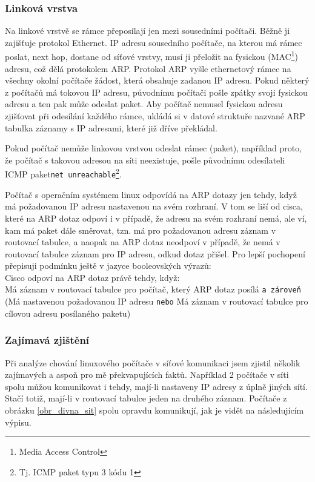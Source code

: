 \subsubsection{Linková vrstva}\label{skutecna_linkova_vrstva}

Na linkové vrstvě se rámce přeposílají jen mezi sousedními počítači. Běžně ji zajišťuje protokol Ethernet. IP adresu sousedního počítače, na kterou má rámec poslat, next hop, dostane od síťové vrstvy, musí ji přeložit na fysickou (MAC\footnote{Media Access Control}) adresu, což dělá protokolem ARP. Protokol ARP vyšle ethernetový rámec na všechny okolní počítače žádost, která obsahuje zadanou IP adresu. Pokud některý z počítačů má tokovou IP adresu, původnímu počítači pošle zpátky svoji fysickou adresu a ten pak může odeslat paket. Aby počítač nemusel fysickou adresu zjišťovat při odesílání každého rámce, ukládá si v datové struktuře nazvané ARP tabulka záznamy s IP adresami, které již dříve překládal.

Pokud počítač nemůže linkovou vrstvou odeslat rámec (paket), například proto, že počítač s takovou adresou na síti neexistuje, pošle původnímu odesílateli ICMP paket\linebreak \verb|net unreachable|\footnote{Tj. ICMP paket typu 3 kódu 1}.

Počítač s operačním systémem linux odpovídá na ARP dotazy jen tehdy, když má požadovanou IP adresu nastavenou na svém rozhraní. V tom se liší od cisca, které na ARP dotaz odpoví i v případě, že adresu na svém rozhraní nemá, ale ví, kam má paket dále směrovat, tzn. má pro požadovanou adresu záznam v routovací tabulce, a naopak na ARP dotaz neodpoví v případě, že nemá v routovací tabulce záznam pro IP adresu, odkud dotaz přišel. Pro lepší pochopení přepisuji podmínku ještě v jazyce booleovských výrazů:\\
Cisco odpoví na ARP dotaz právě tehdy, když:\\
Má záznam v routovací tabulce pro počítač, který ARP dotaz posílá \verb|a zároveň| (Má nastavenou požadovanou IP adresu \verb|nebo| Má záznam v routovací tabulce pro cílovou adresu posílaného paketu)

\subsubsection{Zajímavá zjištění}

Při analýze chování linuxového počítače v síťové komunikaci jsem zjistil několik zajímavých a aspoň pro mě překvapujících faktů. Například 2 počítače v síti spolu můžou komunikovat i tehdy, mají-li nastaveny IP adresy z úplně jiných sítí. Stačí totiž, mají-li v routovací tabulce jeden na druhého záznam. Počítače z obrázku \ref{obr_divna_sit} spolu opravdu komunikují, jak je vidět na následujícím výpisu.

